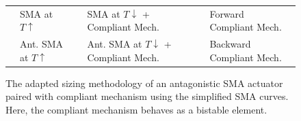\begin{figure}[hbt!] %
  \centering
  \begin{tabular}{l@{ }l l@{ }l l@{ }l}
    {\color{myred} \rule[2pt]{10pt}{0.5mm} } & {\footnotesize SMA at $T\uparrow$} & {\color{myblue} \rule[2pt]{10pt}{0.5mm} } & {\footnotesize SMA at $T\downarrow$ + Compliant Mech.} & {\color{mygreen} \rule[2pt]{10pt}{0.5mm} } & {\footnotesize Forward Compliant Mech.}\\
    {\color{myred} \dottedrule} & {\footnotesize Ant. SMA at $T\uparrow$} & {\color{myblue} \dottedrule } & {\footnotesize Ant. SMA at $T\downarrow$ + Compliant Mech.} & {\color{mygreen} \dottedrule } & {\footnotesize Backward Compliant Mech.}\\
  \end{tabular}
  \caption[The adapted sizing methodology of an antagonistic SMA actuator paired with compliant mechanism using the simplified SMA curves]{The adapted sizing methodology of an antagonistic SMA actuator paired with compliant mechanism using the simplified SMA curves. Here, the compliant mechanism behaves as a bistable element.}
  \label{fig:smaactwp-bb}
\end{figure}

